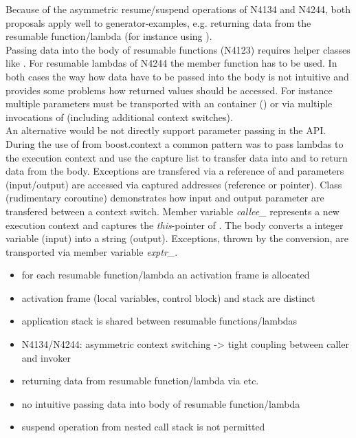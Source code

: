 Because of the asymmetric resume/suspend operations of N4134 and N4244, both
proposals apply well to generator-examples, e.g. returning data from the
resumable function/lambda (for instance using \yield).\\
Passing data into the body of resumable functions (N4123) requires helper
classes like \channel.
For resumable lambdas of N4244 the member function \rlwanted has to be used.
In both cases the way how data have to be passed into the body is not intuitive
and provides some problems how returned values should be accessed. For instance
multiple parameters must be transported with an container (\tuple) or via
multiple invocations of \rlwanted (including additional context switches).\\
\newline
An alternative would be not directly support parameter passing in the API.\\
During the use of  from boost.context\cite{bcontext} a
common pattern was to pass lambdas to the execution context and use the capture
list to transfer data into and to return data from the body. Exceptions are
transfered via a reference of \excpt and parameters (input/output) are accessed
via captured addresses (reference or pointer).
Class  (rudimentary coroutine) demonstrates how input and output
parameter are transfered between a context switch. Member variable
\textit{callee\_} represents a new execution context and captures the
\textit{this}-pointer of . The body converts a integer variable (input)
into a string (output). Exceptions, thrown by the conversion, are transported
via member variable \textit{exptr\_}.

\begin{itemize}
    \item   for each resumable function/lambda an activation frame is allocated
    \item   activation frame (local variables, control block) and stack are
            distinct
    \item   application stack is shared between resumable functions/lambdas
    \item   N4134/N4244: asymmetric context switching -> tight coupling between
            caller and invoker
    \item   returning data from resumable function/lambda via \yield etc.
    \item   no intuitive passing data into body of resumable function/lambda
    \item   suspend operation from nested call stack is not permitted
\end{itemize}

